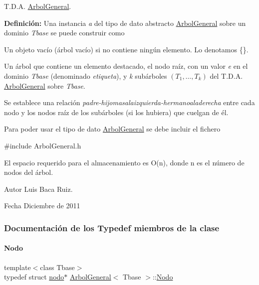 T.\+D.\+A. \hyperlink{classArbolGeneral}{Arbol\+General}. 

{\bfseries Definición\+:} Una instancia {\itshape a} del tipo de dato abstracto \hyperlink{classArbolGeneral}{Arbol\+General} sobre un dominio {\itshape Tbase} se puede construir como


\begin{DoxyItemize}
\item Un objeto vacío (árbol vacío) si no contiene ningún elemento. Lo denotamos \{\}.
\item Un árbol que contiene un elemento destacado, el nodo raíz, con un valor {\itshape e} en el dominio {\itshape Tbase} (denominado {\itshape etiqueta}), y {\itshape k} subárboles $(T_1, \ldots, T_k)$ del T.\+D.\+A. \hyperlink{classArbolGeneral}{Arbol\+General} sobre {\itshape Tbase}.
\end{DoxyItemize}

Se establece una relación {\itshape padre-\/hijomasalaizquierda-\/hermanoaladerecha} entre cada nodo y los nodos raíz de los subárboles (si los hubiera) que cuelgan de él.

Para poder usar el tipo de dato \hyperlink{classArbolGeneral}{Arbol\+General} se debe incluir el fichero

{\ttfamily \#include Arbol\+General.\+h}

El espacio requerido para el almacenamiento es O(n), donde n es el número de nodos del árbol.

\begin{DoxyAuthor}{Autor}
Luis Baca Ruiz. 
\end{DoxyAuthor}
\begin{DoxyDate}{Fecha}
Diciembre de 2011 
\end{DoxyDate}


\subsubsection{Documentación de los \textquotesingle{}Typedef\textquotesingle{} miembros de la clase}
\hypertarget{classArbolGeneral_a12cc1b74a9095d89bc7334290d332f7a}{}\label{classArbolGeneral_a12cc1b74a9095d89bc7334290d332f7a} 
\paragraph{\texorpdfstring{Nodo}{Nodo}}
{\footnotesize\ttfamily template$<$class Tbase$>$ \\
typedef struct \hyperlink{structArbolGeneral_1_1nodo}{nodo}$\ast$ \hyperlink{classArbolGeneral}{Arbol\+General}$<$ Tbase $>$\+::\hyperlink{classArbolGeneral_a12cc1b74a9095d89bc7334290d332f7a}{Nodo}}



